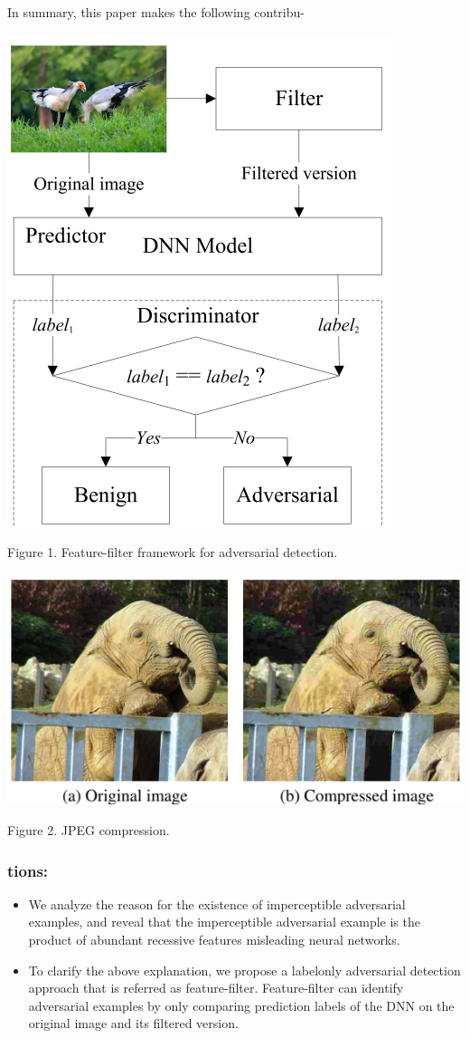 \documentclass{article}
\begin{document}
In summary, this paper makes the following contribu-


\includegraphics{_page_1_Figure_5.png}


Figure 1. Feature-filter framework for adversarial detection.


\includegraphics{_page_1_Picture_7.png}


Figure 2. JPEG compression.

\subsubsection{tions:}
\begin{itemize}
\item 
We analyze the reason for the existence of imperceptible adversarial examples, and reveal that the imperceptible adversarial example is the product of abundant recessive features misleading neural networks.

\item 
To clarify the above explanation, we propose a labelonly adversarial detection approach that is referred as feature-filter. Feature-filter can identify adversarial examples by only comparing prediction labels of the DNN on the original image and its filtered version.

\end{itemize}
\end{document}
